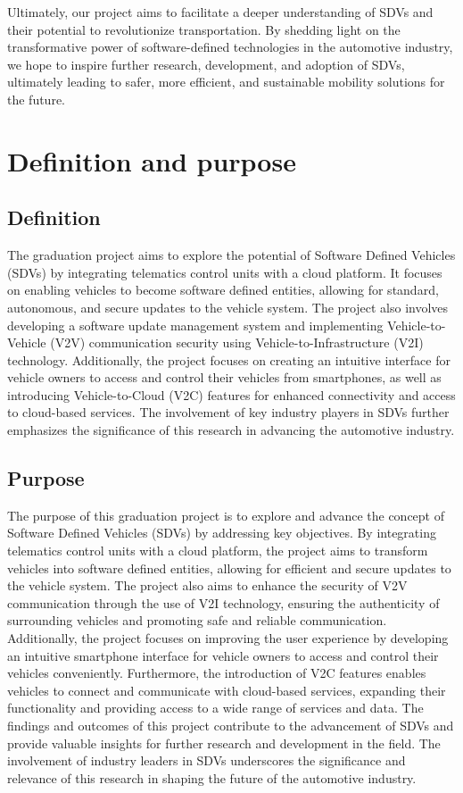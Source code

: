 \documentclass[
12pt,
oneside, 
onehalfspacing, 
nolistspacing, 
parskip, 
chapterinoneline, 
]{AASTCOMPUTER}
\begin{document}
Ultimately, our project aims to facilitate a deeper understanding of SDVs and their potential to revolutionize transportation. By shedding light on the transformative power of software-defined technologies in the automotive industry, we hope to inspire further research, development, and adoption of SDVs, ultimately leading to safer, more efficient, and sustainable mobility solutions for the future.
\section{Definition and purpose}
\subsection{Definition}
The graduation project aims to explore the potential of Software Defined Vehicles (SDVs) by integrating telematics control units with a cloud platform. It focuses on enabling vehicles to become software defined entities, allowing for standard, autonomous, and secure updates to the vehicle system. The project also involves developing a software update management system and implementing Vehicle-to-Vehicle (V2V) communication security using Vehicle-to-Infrastructure (V2I) technology. Additionally, the project focuses on creating an intuitive interface for vehicle owners to access and control their vehicles from smartphones, as well as introducing Vehicle-to-Cloud (V2C) features for enhanced connectivity and access to cloud-based services. The involvement of key industry players in SDVs further emphasizes the significance of this research in advancing the automotive industry.
\subsection{Purpose}
The purpose of this graduation project is to explore and advance the concept of Software Defined Vehicles (SDVs) by addressing key objectives. By integrating telematics control units with a cloud platform, the project aims to transform vehicles into software defined entities, allowing for efficient and secure updates to the vehicle system. The project also aims to enhance the security of V2V communication through the use of V2I technology, ensuring the authenticity of surrounding vehicles and promoting safe and reliable communication. Additionally, the project focuses on improving the user experience by developing an intuitive smartphone interface for vehicle owners to access and control their vehicles conveniently. Furthermore, the introduction of V2C features enables vehicles to connect and communicate with cloud-based services, expanding their functionality and providing access to a wide range of services and data. The findings and outcomes of this project contribute to the advancement of SDVs and provide valuable insights for further research and development in the field. The involvement of industry leaders in SDVs underscores the significance and relevance of this research in shaping the future of the automotive industry.
\end{document}

